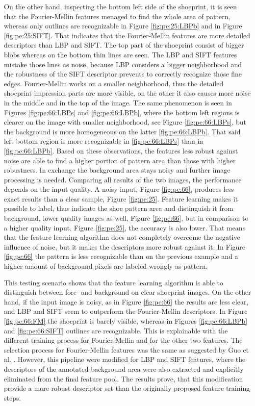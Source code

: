 \documentclass[draft,final]{vutinfth} %
\begin{document}
On the other hand, inspecting the bottom left side of the shoeprint, it is seen that the Fourier-Mellin features menaged to find the whole area of pattern, whereas only outlines are recognizable in Figure \ref{fig:pe:25:LBPb} and in Figure \ref{fig:pe:25:SIFT}.
That indicates that the Fourier-Mellin features are more detailed descriptors than LBP and SIFT. 
The top part of the shoeprint consist of bigger blobs whereas on the bottom thin lines are seen.
The LBP and SIFT features mistake those lines as noise, because LBP considers a bigger neighborhood and the robustness of the SIFT descriptor prevents to correctly recognize those fine edges.
Fourier-Mellin works on a smaller neighborhood, thus the detailed shoeprint impression parts are more visible, on the other it also causes more noise in the middle and in the top of the image.
The same phenomenon is seen in Figures  \ref{fig:pe:66:LBPs} and  \ref{fig:pe:66:LBPb}, where the bottom left regions is clearer on the image  with smaller neighborhood, see Figure \ref{fig:pe:66:LBPs}, but the background is more homogeneous on the latter \ref{fig:pe:66:LBPb}. 
That said left bottom region is more recognizable in  \ref{fig:pe:66:LBPs} than in  \ref{fig:pe:66:LBPb}.
Based on these observations,  the features less robust against noise are able to find a higher portion of pattern area than those with higher robustness.
In exchange the background area stays noisy and further image processing is needed.
Comparing all results of the two images, the performance depends on the input quality.
A noisy input, Figure \ref{fig:pe:66}, produces less exact results than a clear sample, Figure \ref{fig:pe:25}.
Feature learning makes it possible to label, thus indicate the shoe pattern area and distinguish it from background, lower quality images as well,  Figure \ref{fig:pe:66}, but in comparison to a higher quality input, Figure \ref{fig:pe:25}, the accuracy is also lower.
That means that the feature learning algorithm does not completely overcome the negative influence of noise, but it makes the descriptors more robust against it.
In Figure \ref{fig:pe:66} the pattern is less recognizable than on the previous example and a higher amount of background pixels are labeled wrongly as pattern.
\par
This testing scenario shows that the feature learning algorithm is able to distinguish between fore- and background on clear shoeprint images.
On the other hand, if the input image is noisy, as in Figure \ref{fig:pe:66} the results are less clear, and LBP and SIFT seem to outperform the Fourier-Mellin descriptors.
In Figure \ref{fig:pe:66:FM} the shoeprint is barely visible, whereas in Figures \ref{fig:pe:66:LBPb} and \ref{fig:pe:66:SIFT} outlines are recognizable.
This is explainable with the different training process for Fourier-Mellin and for the other two features.
The selection process for Fourier-Mellin features was the same as suggested by Guo et al. \cite{guo2012discriminative}.
However, this pipeline were modified for LBP and SIFT features, where the descriptors of the annotated background area were also extracted and explicitly eliminated from the final feature pool.
The results prove, that this modification provide a more robust descriptor set than the originally proposed feature training steps.
\end{document}
